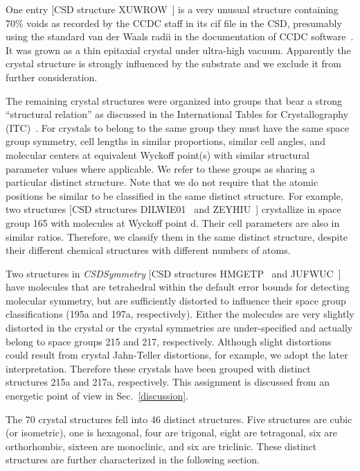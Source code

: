 \documentclass[preprint]{iucr}              %
\begin{document}
One entry [CSD structure XUWROW~\cite{sung02}] is a very unusual
structure containing 70\% voids as recorded by the CCDC staff in its
cif file in the CSD, presumably using the standard van der Waals
radii in the documentation of CCDC software~\cite{Bruno02}. It was
grown as a thin epitaxial crystal under ultra-high vacuum.
Apparently the crystal structure is strongly influenced by the
substrate and we exclude it from further consideration.

The remaining crystal structures were organized into groups that
bear a strong ``structural relation'' as discussed in the
International Tables for Crystallography (ITC)~\cite{Hahn83}. For
crystals to belong to the same group they must have the same space
group symmetry, cell lengths in similar proportions, similar cell
angles, and molecular centers at equivalent Wyckoff point(s) with
similar structural parameter values where applicable.  We refer to
these groups as sharing a particular distinct structure. Note that
we do not require that the atomic positions be similar to be
classified in the same distinct structure. For example, two
structures [CSD structures DILWIE01~\cite{Ebert98} and
ZEYHIU~\cite{Noth95}] crystallize in space group 165 with molecules
at Wyckoff point d. Their cell parameters are also in similar
ratios. Therefore, we classify them in the same distinct structure,
despite their different chemical structures with different numbers
of atoms.

Two structures in \emph{CSDSymmetry} [CSD structures
HMGETP~\cite{Dahl75} and JUFWUC~\cite{Tesh92}] have molecules that
are tetrahedral within the default error bounds for detecting
molecular symmetry, but are sufficiently distorted to influence
their space group classifications (195a and 197a, respectively).
Either the molecules are very slightly distorted in the crystal or
the crystal symmetries are under-specified and actually belong to
space groups 215 and 217, respectively. Although slight distortions
could result from crystal Jahn-Teller distortions, for example, we
adopt the later interpretation. Therefore these crystals have been
grouped with distinct structures 215a and 217a, respectively. This
assignment is discussed from an energetic point of view in
Sec.~\ref{discussion}.

The 70 crystal structures fell into 46 distinct structures. Five
structures are cubic (or isometric), one is hexagonal, four are
trigonal, eight are tetragonal, six are orthorhombic, sixteen are
monoclinic, and six are triclinic. These distinct structures are
further characterized in the following section.
\end{document}
